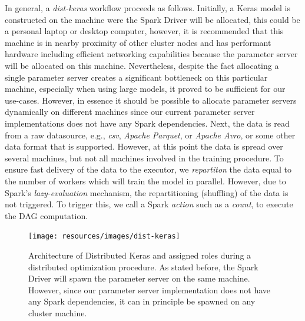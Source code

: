 In general, a \emph{dist-keras} workflow proceeds as follows. Initially, a Keras model is constructed on the machine were the Spark Driver will be allocated, this could be a personal laptop or desktop computer, however, it is recommended that this machine is in nearby proximity of other cluster nodes and has performant hardware including efficient networking capabilities because the parameter server will be allocated on this machine. Nevertheless, despite the fact allocating a single parameter server creates a significant bottleneck on this particular machine, especially when using large models, it proved to be sufficient for our use-cases. However, in essence it should be possible to allocate parameter servers dynamically on different machines since our current parameter server implementations does not have any Spark dependencies. Next, the data is read from a raw datasource, e.g., \emph{csv}, \emph{Apache Parquet}, or \emph{Apache Avro}, or some other data format that is supported. However, at this point the data is spread over several machines, but not all machines involved in the training procedure. To ensure fast delivery of the data to the executor, we \emph{repartiton} the data equal to the number of workers which will train the model in parallel. However, due to Spark's \emph{lazy-evaluation} mechanism, the repartitioning (shuffling) of the data is not triggered. To trigger this, we call a Spark \emph{action} such as a \emph{count}, to execute the DAG computation.

\begin{figure}[H]
  \centering
  \texttt{[image: resources/images/dist-keras]}
  \caption{Architecture of Distributed Keras and assigned roles during a distributed optimization procedure. As stated before, the Spark Driver will spawn the parameter server on the same machine. However, since our parameter server implementation does not have any Spark dependencies, it can in principle be spawned on any cluster machine.}
  \label{fig:dist_keras_architecture}
\end{figure}

